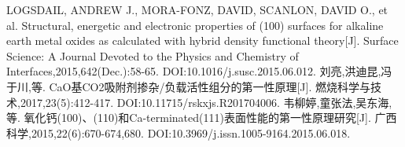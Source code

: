 \documentclass[12pt,a4paper]{article}%
\begin{document}
\begin{thebibliography}{99}
		 LOGSDAIL, ANDREW J., MORA-FONZ, DAVID, SCANLON, DAVID O., et al. Structural, energetic and electronic properties of (100) surfaces for alkaline earth metal oxides as calculated with hybrid density functional theory[J]. Surface Science: A Journal Devoted to the Physics and Chemistry of Interfaces,2015,642(Dec.):58-65. DOI:10.1016/j.susc.2015.06.012.
		 刘亮,洪迪昆,冯于川,等. CaO基CO2吸附剂掺杂/负载活性组分的第一性原理[J]. 燃烧科学与技术,2017,23(5):412-417. DOI:10.11715/rskxjs.R201704006.
		 韦柳婷,童张法,吴东海,等. 氧化钙(100)、(110)和Ca-terminated(111)表面性能的第一性原理研究[J]. 广西科学,2015,22(6):670-674,680. DOI:10.3969/j.issn.1005-9164.2015.06.018.
	\end{thebibliography}
	
	
\end{document}

